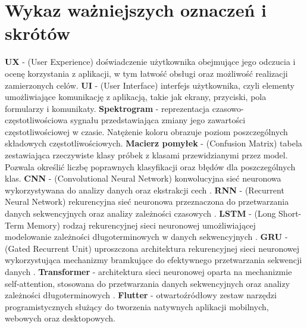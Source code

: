 \chapter*{Wykaz ważniejszych oznaczeń i skrótów} %
\noindent
\textbf{UX} - (User Experience) doświadczenie użytkownika obejmujące jego odczucia i ocenę korzystania z aplikacji, w tym łatwość obsługi oraz możliwość realizacji zamierzonych celów. \newline
\textbf{UI} - (User Interface) interfejs użytkownika, czyli elementy umożliwiające komunikację z aplikacją, takie jak ekrany, przyciski, pola formularzy i komunikaty. \newline
\textbf{Spektrogram} - reprezentacja czasowo-częstotliwościowa sygnału przedstawiająca zmiany jego zawartości częstotliwościowej w czasie. Natężenie koloru obrazuje poziom poszczególnych składowych częstotliwościowych. \newline
\textbf{Macierz pomyłek} - (Confusion Matrix) tabela zestawiająca rzeczywiste klasy próbek z klasami przewidzianymi przez model. Pozwala określić liczbę poprawnych klasyfikacji oraz błędów dla poszczególnych klas. \newline
\textbf{CNN} - (Convolutional Neural Network) konwolucyjna sieć neuronowa wykorzystywana do analizy danych oraz ekstrakcji cech \cite{o2015introduction}. \newline
\textbf{RNN} - (Recurrent Neural Network) rekurencyjna sieć neuronowa przeznaczona do przetwarzania danych sekwencyjnych oraz analizy zależności czasowych \cite{grossberg2013recurrent}. \newline
\textbf{LSTM} - (Long Short-Term Memory) rodzaj rekurencyjnej sieci neuronowej umożliwiającej modelowanie zależności długoterminowych w danych sekwencyjnych \cite{hochreiter1997long}. \newline
\textbf{GRU} - (Gated Recurrent Unit) uproszczona architektura rekurencyjnej sieci neuronowej wykorzystująca mechanizmy bramkujące do efektywnego przetwarzania sekwencji danych \cite{cho2014learning}. \newline
\textbf{Transformer} - architektura sieci neuronowej oparta na mechanizmie self-attention, stosowana do przetwarzania danych sekwencyjnych oraz analizy zależności długoterminowych \cite{vaswani2017attention}. \newline
\textbf{Flutter} - otwartoźródłowy zestaw narzędzi programistycznych służący do tworzenia natywnych aplikacji mobilnych, webowych oraz desktopowych. \newline
